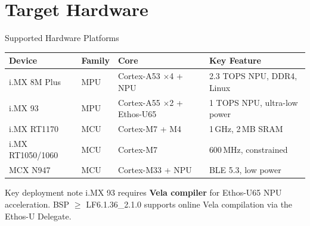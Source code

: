 \documentclass[aspectratio=169]{beamer}
\begin{document}
\section{Target Hardware}

\begin{frame}{Supported Hardware Platforms}
  \centering
  \small
  \begin{tabular}{llll}
    \toprule
    \textbf{Device} & \textbf{Family} & \textbf{Core} & \textbf{Key Feature} \\
    \midrule
    \rowcolor{NXPBlue!10}
    i.MX 8M Plus & MPU & Cortex-A53 $\times$4 + NPU & \alert{2.3 TOPS NPU}, DDR4, Linux \\
    i.MX 93      & MPU & Cortex-A55 $\times$2 + Ethos-U65 & \alert{1 TOPS NPU}, ultra-low power \\
    \rowcolor{NXPBlue!10}
    i.MX RT1170  & MCU & Cortex-M7 + M4 & 1\,GHz, 2\,MB SRAM \\
    i.MX RT1050/1060 & MCU & Cortex-M7 & 600\,MHz, constrained \\
    \rowcolor{NXPBlue!10}
    MCX N947     & MCU & Cortex-M33 + NPU & BLE 5.3, low power \\
    \bottomrule
  \end{tabular}
  \vspace{8pt}
  \begin{block}{Key deployment note}
    i.MX 93 requires \textbf{Vela compiler} for Ethos-U65 NPU acceleration.
    BSP $\geq$ LF6.1.36\_2.1.0 supports online Vela compilation via the Ethos-U Delegate.
  \end{block}
\end{frame}
\end{document}
